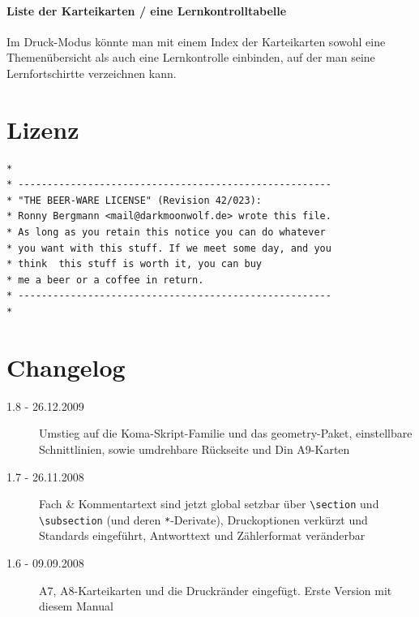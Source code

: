 \documentclass[a4paper,DIV=calc]{scrartcl}
\begin{document}
\paragraph{Liste der Karteikarten / eine Lernkontrolltabelle} 
Im Druck-Modus könnte man mit einem Index der Karteikarten sowohl eine Themenübersicht als auch eine Lernkontrolle einbinden, auf der man seine Lernfortschirtte verzeichnen kann.
\section{Lizenz}
\begin{lstlisting}[basicstyle=\sffamily, numbers=none]
*
* ------------------------------------------------------
* "THE BEER-WARE LICENSE" (Revision 42/023):
* Ronny Bergmann <mail@darkmoonwolf.de> wrote this file.
* As long as you retain this notice you can do whatever
* you want with this stuff. If we meet some day, and you
* think  this stuff is worth it, you can buy
* me a beer or a coffee in return. 
* ------------------------------------------------------
*
\end{lstlisting}
\section{Changelog}
\begin{description}
	\item[1.8 - 26.12.2009] Umstieg auf die Koma-Skript-Familie und das geometry-Paket, einstellbare Schnittlinien, sowie umdrehbare Rückseite und Din A9-Karten
	\item[1.7 - 26.11.2008] Fach \& Kommentartext sind jetzt global setzbar über \lstinline!\section! und \lstinline!\subsection! (und deren \lstinline!*!-Derivate), Druckoptionen verkürzt und Standards eingeführt, Antworttext und Zählerformat veränderbar
	\item[1.6 - 09.09.2008] A7, A8-Karteikarten und die Druckränder eingefügt. Erste Version mit diesem Manual
\end{description}
\end{document}
